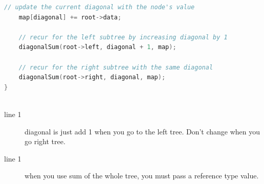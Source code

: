 \documentclass[a4paper,11pt,twoside]{book}
\begin{document}
\begin{itemize}
\begin{lstlisting}[frame=single, language=c++]
	// update the current diagonal with the node's value
	map[diagonal] += root->data;
	
	// recur for the left subtree by increasing diagonal by 1
	diagonalSum(root->left, diagonal + 1, map);
	
	// recur for the right subtree with the same diagonal
	diagonalSum(root->right, diagonal, map);
}
	
\end{lstlisting}
\begin{description}
	\item[line 1] diagonal is just add 1 when you go to the left tree. Don't change when you go right tree. 
	\item[line 1] when you use sum of the whole tree, you must pass a reference type value. 
\end{description}	

\end{itemize}

 
\end{document}
